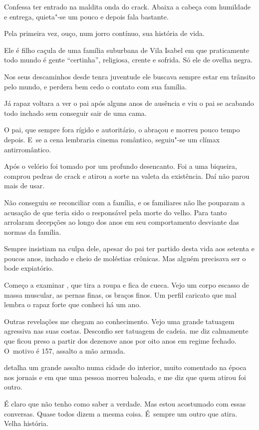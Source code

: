 Confessa ter entrado na maldita onda do crack. Abaixa a cabeça com
humildade e entrega, quieta"-se um pouco e depois fala bastante.

Pela primeira vez, ouço, num jorro contínuo, sua história de vida.

Ele é filho caçula de uma família suburbana de Vila Isabel em que
praticamente todo mundo é gente ``certinha'', religiosa, crente e
sofrida. Só ele de ovelha negra.

Nos seus descaminhos desde tenra juventude ele buscava sempre estar em
trânsito pelo mundo, e perdera bem cedo o contato com sua família.

Já rapaz voltara a ver o pai após alguns anos de ausência e viu o pai se
acabando todo inchado sem conseguir sair de uma cama.

O pai, que sempre fora rígido e autoritário, o abraçou e morreu pouco
tempo depois. E~se a cena lembraria cinema romântico, seguiu"-se um
clímax antirromântico.

Após o velório  foi tomado por um profundo desencanto. Foi a uma
biqueira, comprou pedras de crack e atirou a sorte na valeta da
existência. Daí não parou mais de usar.

Não conseguiu se reconciliar com a família, e os familiares não lhe
pouparam a acusação de que teria sido o responsável pela morte do velho.
Para tanto arrolaram decepções ao longo dos anos em seu comportamento
desviante das normas da família.

Sempre insistiam na culpa dele, apesar do pai ter partido desta vida aos
setenta e poucos anos, inchado e cheio de moléstias crônicas. Mas alguém
precisava ser o bode expiatório.

\asterisc{}

Começo a examinar , que tira a roupa e fica de cueca. Vejo um corpo
escasso de massa muscular, as pernas finas, os braços finos. Um perfil
caricato que mal lembra o rapaz forte que conheci há um ano.

Outras revelações me chegam ao conhecimento. Vejo uma grande tatuagem
agressiva nas suas costas. Desconfio ser tatuagem de cadeia.  me diz
calmamente que ficou preso a partir dos dezenove anos por oito anos em
regime fechado. O~motivo é 157, assalto a mão armada.

 detalha um grande assalto numa cidade do interior, muito comentado na
época nos jornais e em que uma pessoa morreu baleada, e me diz que quem
atirou foi outro.

É claro que não tenho como saber a verdade. Mas estou acostumado com
essas conversas. Quase todos dizem a mesma coisa. É~sempre um outro que
atira. Velha história.

